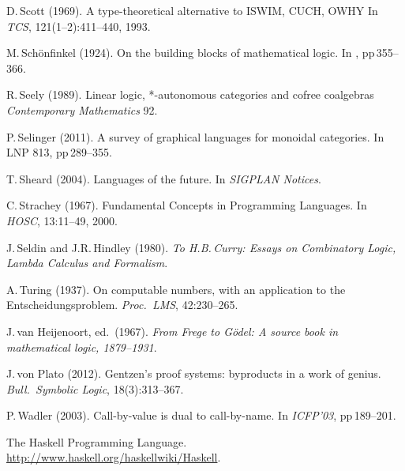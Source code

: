 \documentclass[11pt,twocolumn]{article}
\newcommand{\hide}[1]{}
\begin{document}
{\begin{thebibliography}{000}
D.\,Scott (1969).
\newblock A type-theoretical alternative to ISWIM, CUCH, OWHY
\newblock In \emph{TCS}, 121(1--2):411--440, 1993.

\hide{
\bibitem{ScottCV}
D.\,Scott (1970).
\newblock Constructive validity.
\newblock In LNM 125. 
}

M.\,Sch\"{o}nfinkel (1924).
\newblock On the building blocks of mathematical logic.
\newblock In \emph{\cite{vanHeijenoort}}, pp\,355--366.

R.\,Seely (1989).
\newblock Linear logic, *-autonomous categories and cofree coalgebras 
\newblock \emph{Contemporary Mathematics} 92. 

P.\,Selinger (2011).
\newblock A survey of graphical languages for monoidal categories.
\newblock In LNP 813, pp\,289--355. 

T.\,Sheard (2004).
\newblock Languages of the future.
\newblock In \emph{SIGPLAN Notices}.

C.\,Strachey (1967).
\newblock Fundamental Concepts in Programming Languages.  
\newblock In \emph{HOSC}, 13:11--49, 2000.


J.\,Seldin and J.R.\,Hindley (1980).
\newblock \emph{To H.B.\,Curry: Essays on Combinatory Logic, Lambda
  Calculus and Formalism}.
 
A.\,Turing (1937). 
\newblock On computable numbers, with an application to the
  Entscheidungsproblem. 
\newblock \emph{Proc.\ LMS}, 42:230--265.

J.\,van Heijenoort, ed.\ (1967).
\newblock \emph{From Frege to G\"odel: A source book in mathematical
  logic, 1879--1931}.

J.\,von Plato (2012).
\newblock Gentzen's proof systems: byproducts in a work of genius.
\newblock \emph{Bull.\ Symbolic Logic}, 18(3):313--367.


P.\,Wadler (2003).
\newblock Call-by-value is dual to call-by-name.
\newblock In \emph{ICFP'03}, pp\,189--201.

The Haskell Programming Language.
\newblock \url{http://www.haskell.org/haskellwiki/Haskell}.
\end{thebibliography}
}

\end{document}
